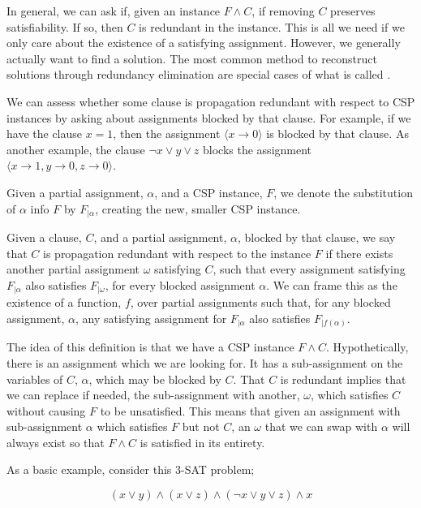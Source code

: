 In general, we can ask if, given an instance $F \wedge C$, if removing $C$ preserves satisfiability. If so, then $C$ is redundant in the instance. This is all we need if we only care about the existence of a satisfying assignment. However, we generally actually want to find a solution. The most common method to reconstruct solutions through redundancy elimination are special cases of what is called .

We can assess whether some clause is propagation redundant with respect to CSP instances by asking about assignments blocked by that clause. For example, if we have the clause $x = 1$, then the assignment $\langle x \rightarrow 0\rangle$ is blocked by that clause. As another example, the clause $\neg x \vee y \vee z$ blocks the assignment $\langle x \rightarrow 1, y \rightarrow 0, z \rightarrow 0\rangle$.

Given a partial assignment, $\alpha$, and a CSP instance, $F$, we denote the substitution of $\alpha$ info $F$ by $F_{|\alpha}$, creating the new, smaller CSP instance.

Given a clause, $C$, and a partial assignment, $\alpha$, blocked by that clause, we say that $C$ is propagation redundant with respect to the instance $F$ if there exists another partial assignment $\omega$ satisfying $C$, such that every assignment satisfying $F_{|\alpha}$ also satisfies $F_{|\omega}$, for every blocked assignment $\alpha$. We can frame this as the existence of a function, $f$, over partial assignments such that, for any blocked assignment, $\alpha$, any satisfying assignment for $F_{|\alpha}$ also satisfies $F_{|f(\alpha)}$.

The idea of this definition is that we have a CSP instance $F \wedge C$. Hypothetically, there is an assignment which we are looking for. It has a sub-assignment on the variables of $C$, $\alpha$, which may be blocked by $C$. That $C$ is redundant implies that we can replace if needed, the sub-assignment with another, $\omega$, which satisfies $C$ without causing $F$ to be unsatisfied. This means that given an assignment with sub-assignment $\alpha$ which satisfies $F$ but not $C$, an $\omega$ that we can swap with $\alpha$ will always exist so that $F \wedge C$ is satisfied in its entirety.

As a basic example, consider this 3-SAT problem;

\begin{equation}\label{equation:two-sat-example-pt1-2}
    (x \lor y) \land (x \lor z) \land (\neg x \lor y \lor z) \land x
\end{equation}

